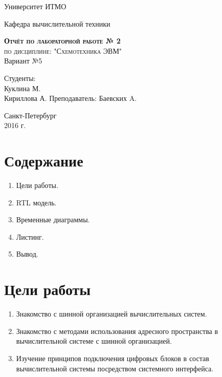 \documentclass[a4paper, 10pt]{article}
\begin{document}
    \begin{titlepage}
        \begin{center}
            \large
            Университет ИТМО
            \vspace{3cm}


            Кафедра вычислительной техники
            \vspace{4cm}

            \textsc{ \textbf{Отчёт по лабораторной работе  № 2} \\
            по дисциплине: "Схемотехника ЭВМ"}\\Вариант №5\\[8mm]

            \bigskip
        \end{center}
        \vspace{3cm}

        \hfill\begin{flushright}
             Студенты: \\
             Куклина М.\\
             Кириллова А.
             \vfill
             Преподаватель:
             Баевских A.
        \end{flushright}
        \vfill
        \vfill
        \vfill
        \vfill
        \vfill
        \begin{center}
            Санкт-Петербург \\2016 г.
        \end{center}
    \end{titlepage}
   \newpage
    \section*{Содержание}
        \begin{enumerate}
            \item Цели работы.
            \item RTL модель.
            \item Временные диаграммы.
            \item Листинг.
            \item Вывод.
        \end{enumerate}

    \section*{Цели работы}
        \begin{enumerate}
            \item  Знакомство с шинной организацией вычислительных систем.
            \item  Знакомство с методами использования адресного пространства в
                   вычислительной системе с шинной организацией.
            \item  Изучение принципов подключения цифровых блоков в состав
                   вычислительной системы посредством системного интерфейса.

        \end{enumerate}
\end{document}
